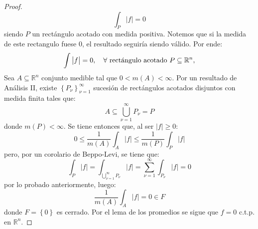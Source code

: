 \documentclass[12pt]{report}
\newcounter{it}
\theoremstyle{largebreak}
\newcommand\abs[1]{\ensuremath{\big|#1\big|}}
\begin{document}
\begin{proof}
\begin{equation*}
            \int_{P}\abs{f}=0
        \end{equation*}
        siendo $P$ un rectángulo acotado con medida positiva. Notemos que si la medida de este rectangulo fuese $0$, el resultado seguiría siendo válido. Por ende:
        \begin{equation*}
            \int \abs{f}=0,\quad\forall\textup{ rectángulo acotado }P\subseteq\mathbb{R}^n,
        \end{equation*}
        Sea $A\subseteq\mathbb{R}^n$ conjunto medible tal que $0<m(A)<\infty$. Por un resultado de Análisis II, existe $\left\{P_\nu \right\}_{\nu=1}^\infty$ sucesión de rectángulos acotados disjuntos con medida finita tales que:
        \begin{equation*}
            A\subseteq \bigcup_{\nu=1}^\infty P_\nu=P
        \end{equation*}
        donde $m(P)<\infty$. Se tiene entonces que, al ser $\abs{f}\geq 0$:
        \begin{equation*}
            0\leq\frac{1}{m(A)} \int_{A}\abs{f}\leq \frac{1}{m(P)}\int_{P}\abs{f}
        \end{equation*}
        pero, por un corolario de Beppo-Levi, se tiene que:
        \begin{equation*}
            \int_{P}\abs{f}=\int_{\bigcup_{\nu=1}^\infty P_\nu}\abs{f}=\sum_{\nu=1}^\infty\int_{P_\nu}\abs{f}=0
        \end{equation*}
        por lo probado anteriormente, luego:
        \begin{equation*}
            \frac{1}{m(A)}\int_{A}\abs{f}=0\in F
        \end{equation*}
        donde $F=\left\{ 0\right\}$ es cerrado. Por el lema de los promedios se sigue que $f=0$ c.t.p. en $\mathbb{R}^n$.
    \end{proof}
\end{document}
